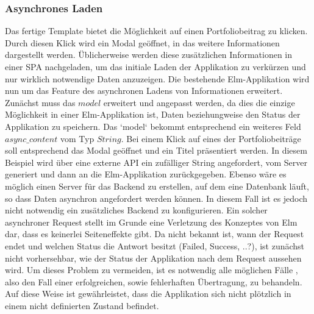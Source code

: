 \subsubsection{Asynchrones Laden}
\label{sec:Asynchrones Laden - Analyse}
Das fertige Template bietet die Möglichkeit auf einen Portfoliobeitrag zu klicken. Durch diesen Klick wird ein Modal geöffnet, in das weitere Informationen dargestellt werden. Üblicherweise werden diese zusätzlichen Informationen in einer \ac{SPA} nachgeladen, um das initiale Laden der Applikation zu verkürzen und nur wirklich notwendige Daten anzuzeigen. Die bestehende Elm-Applikation wird nun um das Feature des asynchronen Ladens von Informationen erweitert.
Zunächst muss das $model$ erweitert und angepasst werden, da dies die einzige Möglichkeit in einer Elm-Applikation ist, Daten beziehungweise den Status der Applikation zu speichern. Das `model` bekommt entsprechend ein weiteres Feld $async\_content$ vom Typ $String$.
Bei einem Klick auf eines der Portfoliobeiträge soll entsprechend das Modal geöffnet und ein Titel präsentiert werden. In diesem Beispiel wird über eine externe API ein zufälliger String angefordert, vom Server generiert und dann an die Elm-Applikation zurückgegeben. Ebenso wäre es möglich einen Server für das Backend zu erstellen, auf dem eine Datenbank läuft, so dass Daten asynchron angefordert werden können. In diesem Fall ist es jedoch nicht notwendig ein zusätzliches Backend zu konfigurieren.
Ein solcher asynchroner Request stellt im Grunde eine Verletzung des Konzeptes von Elm dar, dass es keinerlei Seiteneffekte gibt. Da nicht bekannt ist, wann der Request endet und welchen Status die Antwort besitzt (Failed, Success, ..?), ist zunächst nicht vorhersehbar, wie der Status der Applikation nach dem Request aussehen wird. Um dieses Problem zu vermeiden, ist es notwendig alle möglichen Fälle , also den Fall einer erfolgreichen, sowie fehlerhaften Übertragung, zu behandeln. Auf diese Weise ist gewährleistet, dass die Applikation sich nicht plötzlich in einem nicht definierten Zustand befindet.
